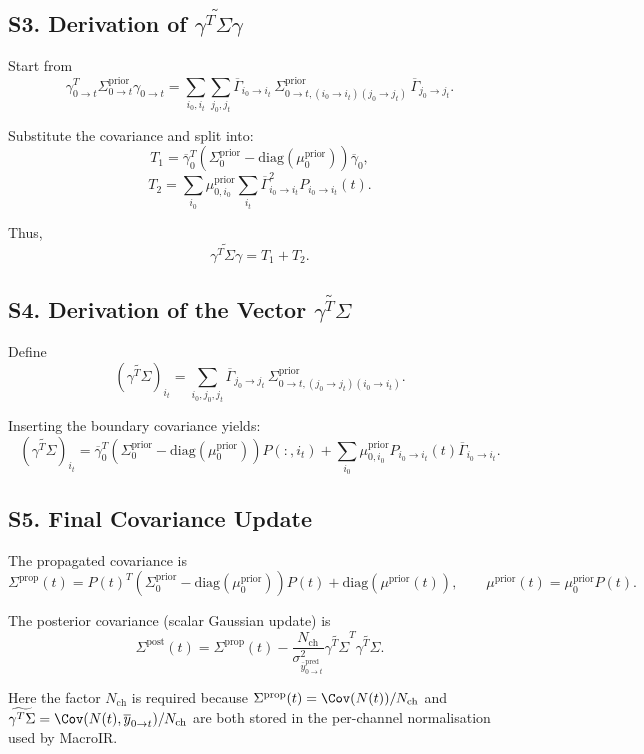 \documentclass[11pt]{article}
\begin{document}
\subsection*{S3. Derivation of $\widetilde{\gamma^{T}\Sigma\gamma}$}

Start from
\[
\gamma_{0\to t}^T \Sigma^{\text{prior}}_{0\to t} \gamma_{0\to t}
= \sum_{i_0,i_t}\sum_{j_0,j_t}
\overline{\Gamma}_{i_0\to i_t}\,
\Sigma^{\text{prior}}_{0\to t,(i_0\to i_t)(j_0\to j_t)}\,
\overline{\Gamma}_{j_0\to j_t}.
\]

Substitute the covariance and split into:
\[
T_1 = \overline{\gamma}_0^T(\Sigma^{\text{prior}}_0 - \mathrm{diag}(\mu^{\text{prior}}_0))\overline{\gamma}_0,
\]
\[
T_2 = \sum_{i_0}\mu^{\text{prior}}_{0,i_0}\sum_{i_t}
\overline{\Gamma}_{i_0\to i_t}^2 P_{i_0\to i_t}(t).
\]

Thus,
\[
\widetilde{\gamma^{T}\Sigma\gamma}
= T_1 + T_2.
\]

\subsection*{S4. Derivation of the Vector $\widetilde{\gamma^{T}\Sigma}$}

Define
\[
(\widetilde{\gamma^{T}\Sigma})_{i_t}
=
\sum_{i_0,j_0,j_t}
\overline{\Gamma}_{j_0\to j_t}\,
\Sigma^{\text{prior}}_{0\to t,(j_0\to j_t)(i_0\to i_t)}.
\]

Inserting the boundary covariance yields:
\[
(\widetilde{\gamma^{T}\Sigma})_{i_t}
=
\overline{\gamma}_0^T
(\Sigma^{\text{prior}}_0 - \mathrm{diag}(\mu^{\text{prior}}_0))P(:,i_t)
+
\sum_{i_0}\mu^{\text{prior}}_{0,i_0}P_{i_0\to i_t}(t)\overline{\Gamma}_{i_0\to i_t}.
\]

\subsection*{S5. Final Covariance Update}

The propagated covariance is
\[
\Sigma^{\text{prop}}(t)
=
P(t)^T(\Sigma^{\text{prior}}_0 - \mathrm{diag}(\mu^{\text{prior}}_0))P(t)
+ \mathrm{diag}(\mu^{\text{prior}}(t)),
\qquad
\mu^{\text{prior}}(t)=\mu^{\text{prior}}_0P(t).
\]

The posterior covariance (scalar Gaussian update) is
\[
\Sigma^{\text{post}}(t)
=
\Sigma^{\text{prop}}(t)
-
\frac{N_{\mathrm{ch}}}{\sigma^2_{\overline{y}^{\mathrm{pred}}_{0\to t}}}
\widetilde{\gamma^{T}\Sigma}^T
\widetilde{\gamma^{T}\Sigma}.
\]

Here the factor \(N_{\mathrm{ch}}\) is required because
\(
\Sigma^{\text{prop}}(t)=\Cov(N(t))/N_{\mathrm{ch}}
\)
and
\(
\widetilde{\gamma^{T}\Sigma}
=
\Cov(N(t),\overline{y}_{0\to t})/N_{\mathrm{ch}}
\)
are both stored in the per-channel normalisation used by MacroIR.
\end{document}
